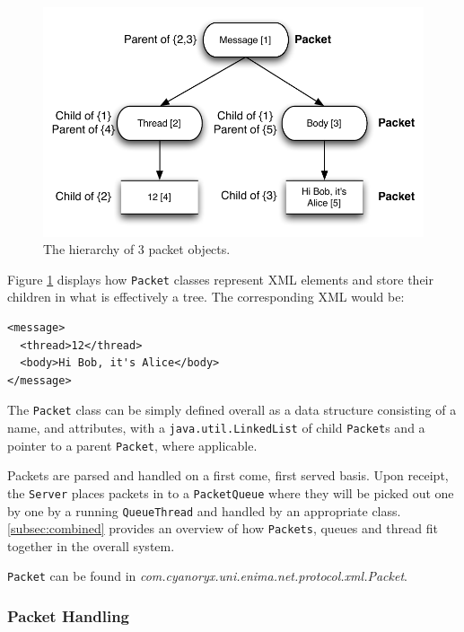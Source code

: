     \begin{figure}
      \centering
      \includegraphics[scale=0.7]{./Figures/Ch6/6-4-4-2.pdf}
      \caption{The hierarchy of 3 packet objects.}
      \label{fig:packet_hierarchy}
    \end{figure}
    
    Figure \ref{fig:packet_hierarchy} displays how \verb!Packet! classes represent XML elements and store their children in what is effectively a tree. The corresponding XML would be:
    
    \begin{verbatim}
<message>
  <thread>12</thread>
  <body>Hi Bob, it's Alice</body>
</message>
    \end{verbatim}
    
    The \verb!Packet! class can be simply defined overall as a data structure consisting of a name, and attributes, with a \verb!java.util.LinkedList! of child \verb!Packet!s and a pointer to a parent \verb!Packet!, where applicable.
    
    Packets are parsed and handled on a first come, first served basis. Upon receipt, the \verb!Server! places packets in to a \verb!PacketQueue! where they will be picked out one by one by a running \verb!QueueThread! and handled by an appropriate class. \textsection\ref{subsec:combined} provides an overview of how \verb!Packets!, queues and thread fit together in the overall system.
    
    \verb!Packet! can be found in \emph{com.cyanoryx.uni.enima.net.protocol.xml.Packet}.
    
    \subsubsection{Packet Handling}
    \label{subsubsec:packet_queue}
    
